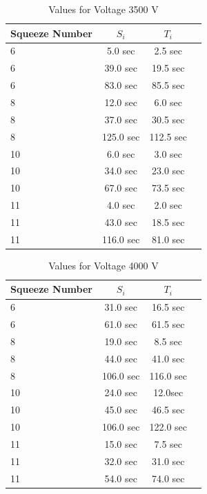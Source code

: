 \documentclass[aps,twocolumn,secnumarabic,nobalancelastpage,amsmath,amssymb,
nofootinbib]{revtex4}
\begin{document}
\begin{center}
\begin{table}[htbp]
\begin{tabular}{|l|c|c|r|}
\hline
{\small Squeeze Number} & { \small ${S}_{i}$} & {\small  ${T}_{i} $ } \\
\hline
6& 5.0 sec & 2.5 sec  \\
6& 39.0 sec & 19.5 sec  \\
6& 83.0 sec & 85.5 sec  \\
8& 12.0 sec & 6.0 sec  \\
8& 37.0 sec & 30.5 sec  \\
8& 125.0 sec & 112.5 sec  \\
10& 6.0 sec & 3.0 sec  \\
10& 34.0 sec & 23.0 sec  \\
10& 67.0 sec & 73.5 sec  \\
11& 4.0 sec & 2.0 sec  \\
11& 43.0 sec & 18.5 sec  \\
11& 116.0 sec & 81.0 sec  \\


\hline
\end{tabular}
\caption{\label{tab:linfitresults} Values for Voltage 3500 V }
\end{table}
\end{center}

\begin{center}
\begin{table}[htbp]
\begin{tabular}{|l|c|c|r|}
\hline
{\small Squeeze Number} & { \small ${S}_{i}$} & {\small  ${T}_{i} $ } \\
\hline
6& 31.0 sec & 16.5 sec  \\
6& 61.0 sec & 61.5 sec  \\
8& 19.0 sec & 8.5 sec  \\
8& 44.0 sec & 41.0 sec  \\
8& 106.0 sec & 116.0 sec  \\
10& 24.0 sec & 12.0sec  \\
10& 45.0 sec & 46.5 sec  \\
10& 106.0 sec & 122.0 sec  \\
11& 15.0 sec & 7.5 sec  \\
11& 32.0 sec & 31.0 sec  \\
11& 54.0 sec & 74.0 sec  \\


\hline
\end{tabular}
\caption{\label{tab:linfitresults} Values for Voltage 4000 V }
\end{table}
\end{center}
\end{document}
